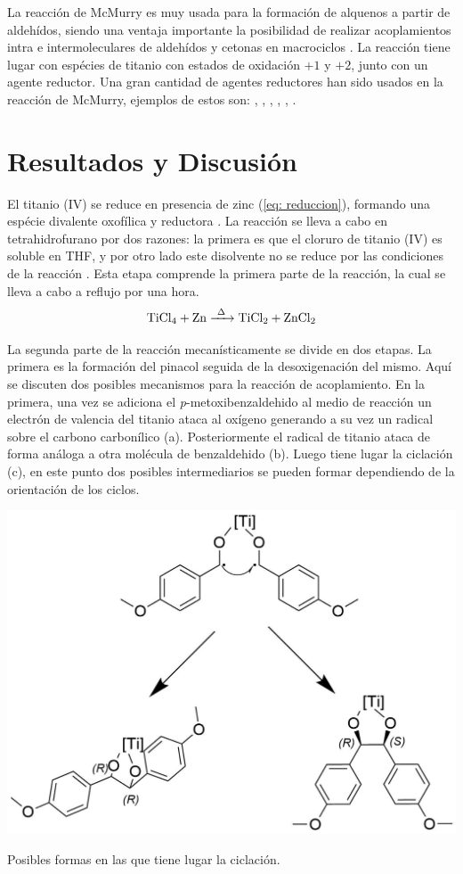 \documentclass[fleqn,10pt]{SelfArx}
\begin{document}
La reacci\'on de McMurry es muy usada para la formaci\'on de alquenos a partir de aldeh\'idos, siendo una ventaja importante la posibilidad de realizar acoplamientos intra e intermoleculares de aldeh\'idos y cetonas en macrociclos \cite{Wang2010}\cite{Villiers1997}. La reacci\'on tiene lugar con esp\'ecies de titanio con estados de oxidaci\'on $+1$ y $+2$, junto con un agente reductor. Una gran cantidad de agentes reductores han sido usados en la reacci\'on de McMurry, ejemplos de estos son: , , , , ,  \cite{Wang2010}.

\newpage

\section{Resultados y Discusi\'on}
El titanio (IV) se reduce en presencia de zinc (\autoref{eq: reduccion}), formando una esp\'ecie divalente oxof\'ilica y reductora \cite{richards2001}. La reacci\'on se lleva a cabo en tetrahidrofurano por dos razones: la primera es que el cloruro de titanio (IV) es soluble en THF, y por otro lado este disolvente no se reduce por las condiciones de la reacci\'on \cite{richards2001}. Esta etapa comprende la primera parte de la reacci\'on, la cual se lleva a cabo a reflujo por una hora.
\begin{equation}\label{eq: reduccion}
	\ce{TiCl_4 + Zn ->[\Delta] TiCl2 + ZnCl2}
\end{equation}

La segunda parte de la reacci\'on mecan\'isticamente se divide en dos etapas. La primera es la formaci\'on del pinacol seguida de la desoxigenaci\'on del mismo. Aquí se discuten dos posibles mecanismos para la reacci\'on de acoplamiento. En la primera, una vez se adiciona el \textit{p}-metoxibenzaldehido al medio de reacci\'on un electr\'on de valencia del titanio ataca al ox\'igeno generando a su vez un radical sobre el carbono carbon\'ilico (a). Posteriormente el radical de titanio ataca de forma an\'aloga a otra mol\'ecula de benzaldehido (b). Luego tiene lugar la ciclaci\'on (c), en este punto dos posibles intermediarios se pueden formar dependiendo de la orientaci\'on de los ciclos.
\begin{scheme}[h]
	\centering
	\includegraphics[width = 0.8\linewidth]{structures/EZdetermined.png}
	\caption{Posibles formas en las que tiene lugar la ciclaci\'on.}
	\label{sch: EZ}
\end{scheme}
\end{document}
